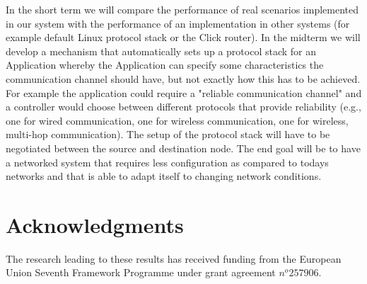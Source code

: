 \documentclass{sig-alternate}
\begin{document}
In the short term we will compare the performance of real scenarios implemented in our system with the performance of an implementation in other systems (for example default Linux protocol stack or the Click router). In the midterm we will develop a mechanism that automatically sets up a protocol stack for an Application whereby the Application can specify some characteristics the communication channel should have, but not exactly how this has to be achieved. For example the application could require a "reliable communication channel" and a controller would choose between different protocols that provide reliability (e.g., one for wired communication, one for wireless communication, one for wireless, multi-hop communication). The setup of the protocol stack will have to be negotiated between the source and destination node. The end goal will be to have a networked system that requires less configuration as compared to todays networks and that is able to adapt itself to changing network conditions.   



\section{Acknowledgments}
The research leading to these results has received funding from the European Union Seventh Framework Programme under grant agreement $n^o 257906$.
%

%
%
\end{document}

